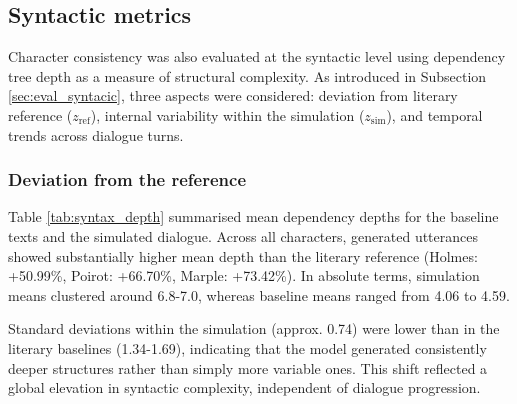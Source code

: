 \documentclass{article}
\begin{document}
\subsection{Syntactic metrics} \label{sec:results_syntactic}

Character consistency was also evaluated at the syntactic level using dependency tree depth as a measure of structural complexity. As introduced in Subsection \ref{sec:eval_syntacic}, three aspects were considered: deviation from literary reference ($z_{\mathrm{ref}}$), internal variability within the simulation ($z_{\mathrm{sim}}$), and temporal trends across dialogue turns.

\subsubsection{Deviation from the reference}

Table \ref{tab:syntax_depth} summarised mean dependency depths for the baseline texts and the simulated dialogue. Across all characters, generated utterances showed substantially higher mean depth than the literary reference (Holmes: +50.99\%, Poirot: +66.70\%, Marple: +73.42\%). In absolute terms, simulation means clustered around 6.8-7.0, whereas baseline means ranged from 4.06 to 4.59.

\begin{table}[H]
\centering
{}%
\caption{Mean syntactic depth and deviation from literary reference by character}
\label{tab:syntax_depth}
\end{table}

Standard deviations within the simulation (approx. 0.74) were lower than in the literary baselines (1.34-1.69), indicating that the model generated consistently deeper structures rather than simply more variable ones. This shift reflected a global elevation in syntactic complexity, independent of dialogue progression.
\end{document}
